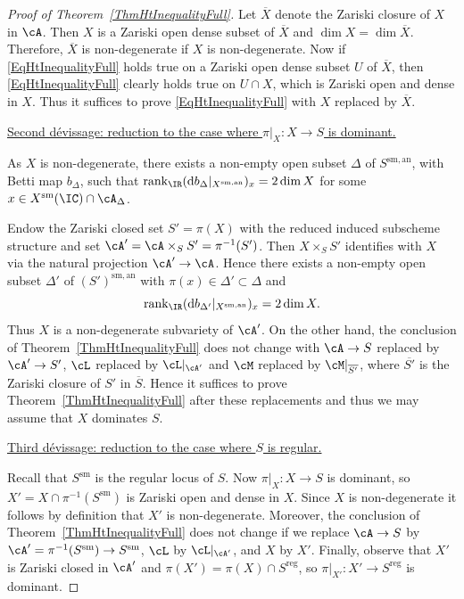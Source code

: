 \begin{proof}[Proof of Theorem~\ref{ThmHtInequalityFull}]
Let $\overline{X}$ denote the
Zariski closure of $X$ in $\cA$. Then $X$
is a Zariski open dense subset of $\overline{X}$ and $\dim X = \dim
\overline{X}$. %
Therefore, $\overline X$ is non-degenerate if $X$ is non-degenerate.
Now if
\eqref{EqHtInequalityFull} holds true on a Zariski open dense subset
$U$ of $\overline{X}$, then \eqref{EqHtInequalityFull} clearly holds
true on $U \cap X$, which is Zariski open and dense in $X$. Thus it suffices to prove \eqref{EqHtInequalityFull} with $X$ replaced by $\overline{X}$. %


\ul{Second d\'{e}vissage: reduction to the case where $\pi|_{X}\colon X\rightarrow
  S$ is dominant.}

  As $X$ is non-degenerate, there exists a non-empty open subset $\Delta$ of $S^{\mathrm{sm,an}}$, with Betti map $b_{\Delta}$, such that $\mathrm{rank}_{\IR}(\mathrm{d}b_{\Delta}|_{X^{\mathrm{sm,an}}})_x = 2 \dim X$ for some $x \in X^{\mathrm{sm}}(\IC) \cap \cA_{\Delta}$.

Endow the Zariski closed set $S'=\pi(X)$ with the reduced induced
subscheme structure and set $\cA' = \cA \times_S S' =
\pi^{-1}(S')$. Then $X \times_S S'$ identifies with $X$ via the natural projection $\cA' \rightarrow \cA$. Hence there exists a non-empty open subset $\Delta'$
of $(S')^{\mathrm{sm,an}}$ with $\pi(x) \in \Delta'\subset \Delta$ and
\[
 \mathrm{rank}_{\IR} (\mathrm{d}b_{\Delta'}|_{X^{\mathrm{sm,an}}})_x = 2\dim X.
\]
Thus $X$ is a non-degenerate subvariety of $\cA'$. On the other hand,
the conclusion of  Theorem~\ref{ThmHtInequalityFull} does not change
with $\cA \rightarrow S$ replaced by $\cA' \rightarrow S'$, $\cL$
replaced by $\cL|_{\cA'}$ and $\cM$ replaced by $\cM|_{\overline{S'}}$,
 where $\overline{S'}$ is the Zariski closure of $S'$ in $\overline{S}$.
Hence it suffices to prove Theorem~\ref{ThmHtInequalityFull} after
these replacements and thus we may assume that $X$ dominates $S$.


\ul{Third d\'{e}vissage: reduction to the case where $S$ is regular.}

Recall that $S^{\mathrm{sm}}$ is the regular locus of $S$.
Now $\pi|_X\colon X\rightarrow S$ is dominant, so
$X'=X\cap \pi^{-1}(S^{\mathrm{sm}})$ is Zariski open and dense in
$X$.
Since $X$ is non-degenerate it follows by definition that  $X'$ is
non-degenerate. Moreover, the conclusion of
Theorem~\ref{ThmHtInequalityFull} does not change if we replace $\cA
\rightarrow S$ by $\cA' = \pi^{-1}(S^{\mathrm{sm}})
\rightarrow S^{\mathrm{sm}}$, $\cL$ by $\cL|_{\cA'}$,
and $X$ by $X'$.
Finally, observe that $X'$ is Zariski closed in $\cA'$
and $\pi(X') = \pi(X)\cap S^{\mathrm{reg}}$, so $\pi|_{X'}\colon X'
\rightarrow S^{\mathrm{reg}}$ is dominant.



\end{proof}
